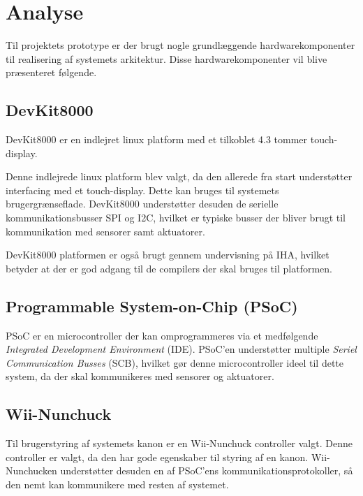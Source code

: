 \chapter{Analyse}
\label{afsnit:analyse}
Til projektets prototype er der brugt nogle grundlæggende hardwarekomponenter til realisering af systemets arkitektur. Disse hardwarekomponenter vil blive præsenteret følgende.

\section{DevKit8000}
DevKit8000 er en indlejret linux platform med et tilkoblet 4.3 tommer touch-display.

Denne indlejrede linux platform blev valgt, da den allerede fra start understøtter interfacing med et touch-display. Dette kan bruges til systemets brugergrænseflade. DevKit8000 understøtter desuden de serielle kommunikationsbusser SPI og I2C, hvilket er typiske busser der bliver brugt til kommunikation med sensorer samt aktuatorer. 

DevKit8000 platformen er også brugt gennem undervisning på IHA, hvilket betyder at der er god adgang til de compilers der skal bruges til platformen.

\section{Programmable System-on-Chip (PSoC)}
PSoC er en microcontroller der kan omprogrammeres via et medfølgende \textit{Integrated Development Environment} (IDE). PSoC'en understøtter multiple \textit{Seriel Communication Busses} (SCB), hvilket gør denne microcontroller ideel til dette system, da der skal kommunikeres med sensorer og aktuatorer.

\section{Wii-Nunchuck}
Til brugerstyring af systemets kanon er en Wii-Nunchuck controller valgt. Denne controller er valgt, da den har gode egenskaber til styring af en kanon. Wii-Nunchucken understøtter desuden en af PSoC'ens kommunikationsprotokoller, så den nemt kan kommunikere med resten af systemet.